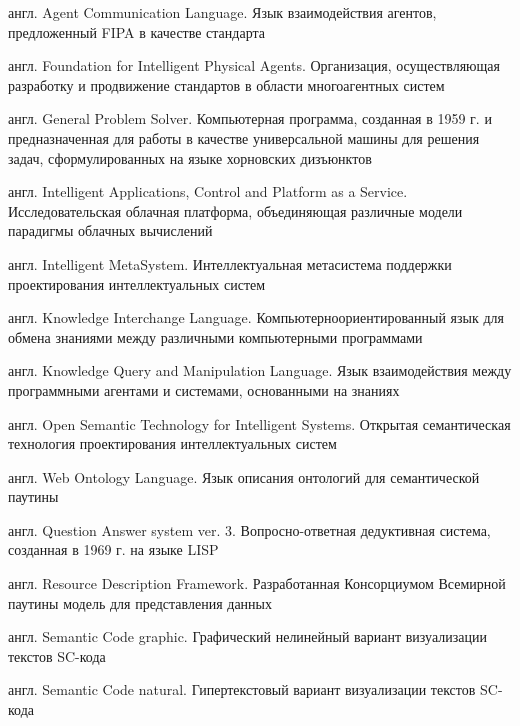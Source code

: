 %
%


\begin{description}[AAAAAAAA]
\item[ACL]{англ. Agent Communication Language. Язык взаимодействия агентов, предложенный FIPA в качестве стандарта}
\item[FIPA]{англ. Foundation for Intelligent Physical Agents. Организация, осуществляющая разработку и продвижение стандартов в области многоагентных систем}
\item[GPS]{англ. General Problem Solver. Компьютерная программа, созданная в 1959 г. и предназначенная для работы в качестве универсальной машины для решения задач, сформулированных на языке хорновских дизъюнктов}
\item[IACPaaS]{англ. Intelligent Applications, Control and Platform as a Service. Исследовательская облачная платформа, объединяющая различные модели парадигмы облачных вычислений}
\item[IMS]{англ. Intelligent MetaSystem. Интеллектуальная метасистема поддержки проектирования интеллектуальных систем}
\item[KIF]{англ. Knowledge Interchange Language. Компьютерноориентированный язык для обмена знаниями между различными компьютерными программами}
\item[KQML]{англ. Knowledge Query and Manipulation Language. Язык взаимодействия между программными агентами и системами, основанными на знаниях}
\item[OSTIS]{англ. Open Semantic Technology for Intelligent Systems. Открытая семантическая технология проектирования интеллектуальных систем}
\item[OWL]{англ. Web Ontology Language. Язык описания онтологий для семантической паутины}
\item[QA3]{англ. Question Answer system ver. 3. Вопросно-ответная дедуктивная система, созданная в 1969 г. на языке LISP}
\item[RDF]{англ. Resource Description Framework. Разработанная Консорциумом Всемирной паутины модель для представления данных}
\item[SCg-код]{англ. Semantic Code graphic. Графический нелинейный вариант визуализации текстов SC-кода}
\item[SCn-код]{англ. Semantic Code natural. Гипертекстовый вариант визуализации текстов SC-кода}

\end{description}
